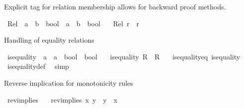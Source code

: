 \begin{isabellebody}
%
\begin{isamarkuptext}%
Explicit tag for relation membership allows for
  backward proof methods.%
\end{isamarkuptext}\isamarkuptrue%
\isamarkupfalse%
\ Rel\ {\isacharcolon}{\kern0pt}{\isacharcolon}{\kern0pt}\ {\isachardoublequoteopen}{\isacharparenleft}{\kern0pt}{\isacharprime}{\kern0pt}a\ {\isasymRightarrow}\ {\isacharprime}{\kern0pt}b\ {\isasymRightarrow}\ bool{\isacharparenright}{\kern0pt}\ {\isasymRightarrow}\ {\isacharprime}{\kern0pt}a\ {\isasymRightarrow}\ {\isacharprime}{\kern0pt}b\ {\isasymRightarrow}\ bool{\isachardoublequoteclose}\isanewline
\ \ \ {\isachardoublequoteopen}Rel\ r\ {\isasymequiv}\ r{\isachardoublequoteclose}%
\begin{isamarkuptext}%
Handling of equality relations%
\end{isamarkuptext}\isamarkuptrue%
\isamarkupfalse%
\ is{\isacharunderscore}{\kern0pt}equality\ {\isacharcolon}{\kern0pt}{\isacharcolon}{\kern0pt}\ {\isachardoublequoteopen}{\isacharparenleft}{\kern0pt}{\isacharprime}{\kern0pt}a\ {\isasymRightarrow}\ {\isacharprime}{\kern0pt}a\ {\isasymRightarrow}\ bool{\isacharparenright}{\kern0pt}\ {\isasymRightarrow}\ bool{\isachardoublequoteclose}\isanewline
\ \ \ {\isachardoublequoteopen}is{\isacharunderscore}{\kern0pt}equality\ R\ {\isasymlongleftrightarrow}\ R\ {\isacharequal}{\kern0pt}\ {\isacharparenleft}{\kern0pt}{\isacharequal}{\kern0pt}{\isacharparenright}{\kern0pt}{\isachardoublequoteclose}\isanewline
\isanewline
{}\isamarkupfalse%
\ is{\isacharunderscore}{\kern0pt}equality{\isacharunderscore}{\kern0pt}eq{\isacharcolon}{\kern0pt}\ {\isachardoublequoteopen}is{\isacharunderscore}{\kern0pt}equality\ {\isacharparenleft}{\kern0pt}{\isacharequal}{\kern0pt}{\isacharparenright}{\kern0pt}{\isachardoublequoteclose}\isanewline
%
\isadelimproof
\ \ %
\endisadelimproof
%
\isatagproof
{}\isamarkupfalse%
\ is{\isacharunderscore}{\kern0pt}equality{\isacharunderscore}{\kern0pt}def\ \isamarkupfalse%
\ simp%
\endisatagproof
{\isafoldproof}%
%
\isadelimproof
%
\endisadelimproof
%
\begin{isamarkuptext}%
Reverse implication for monotonicity rules%
\end{isamarkuptext}\isamarkuptrue%
\isamarkupfalse%
\ rev{\isacharunderscore}{\kern0pt}implies\ \isanewline
\ \ {\isachardoublequoteopen}rev{\isacharunderscore}{\kern0pt}implies\ x\ y\ {\isasymlongleftrightarrow}\ {\isacharparenleft}{\kern0pt}y\ {\isasymlongrightarrow}\ x{\isacharparenright}{\kern0pt}{\isachardoublequoteclose}%

\end{isabellebody}
